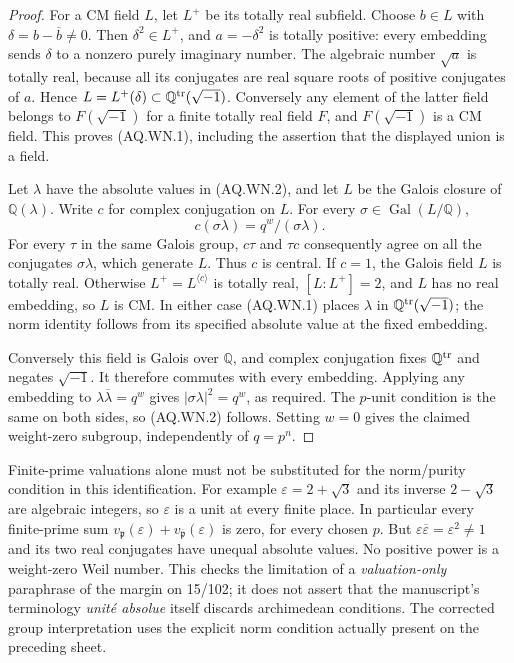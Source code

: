 \documentclass[11pt,a4paper]{article}
\theoremstyle{definition}\newtheorem{definition}[theorem]{Definition}
\theoremstyle{remark}\newtheorem{remark}[theorem]{Remark}
\begin{document}
\begin{proof}
For a CM field $L$, let $L^+$ be its totally real
subfield.  Choose $b\in L$ with
$\delta=b-\overline b\ne0$.  Then
$\delta^2\in L^+$, and $a=-\delta^2$ is totally positive:
every embedding sends $\delta$ to a nonzero purely
imaginary number.  The algebraic number $\sqrt a$
is totally real, because all its conjugates are real
square roots of positive conjugates of $a$.
Hence
$L=L^+(\delta)\subset\mathbb Q^{\rm tr}(\sqrt{-1})$.
Conversely any element of the latter field belongs to
$F(\sqrt{-1})$ for a finite totally real field $F$,
and $F(\sqrt{-1})$ is a CM field.  This proves (AQ.WN.1),
including the assertion that the displayed union is a field.

Let $\lambda$ have the absolute values in (AQ.WN.2),
and let $L$ be the Galois closure of $\mathbb Q(\lambda)$.
Write $c$ for complex conjugation on $L$.
For every $\sigma\in\operatorname{Gal}(L/\mathbb Q)$,
\[
 c(\sigma\lambda)=q^w/(\sigma\lambda).
\]
For every $\tau$ in the same Galois group,
$c\tau$ and $\tau c$ consequently agree on all the
conjugates $\sigma\lambda$, which generate $L$.
Thus $c$ is central.
If $c=1$, the Galois field $L$ is totally real.
Otherwise $L^+=L^{\langle c\rangle}$ is totally real,
$[L:L^+]=2$, and $L$ has no real embedding, so $L$ is CM.
In either case (AQ.WN.1) places $\lambda$ in
$\mathbb Q^{\rm tr}(\sqrt{-1})$; the norm identity follows
from its specified absolute value at the fixed embedding.

Conversely this field is Galois over $\mathbb Q$, and
complex conjugation fixes $\mathbb Q^{\rm tr}$ and
negates $\sqrt{-1}$.  It therefore commutes with every
embedding.  Applying any embedding to
$\lambda\overline\lambda=q^w$ gives
$|\sigma\lambda|^2=q^w$, as required.
The $p$-unit condition is the same on both sides,
so (AQ.WN.2) follows.  Setting $w=0$ gives the claimed
weight-zero subgroup, independently of $q=p^n$.
\end{proof}

Finite-prime valuations alone must not be substituted
for the norm/purity condition in this identification.
For example $\varepsilon=2+\sqrt3$ and its inverse
$2-\sqrt3$ are algebraic integers, so $\varepsilon$
is a unit at every finite place.  In particular every
finite-prime sum $v_{\mathfrak p}(\varepsilon)+
v_{\overline{\mathfrak p}}(\varepsilon)$ is zero,
for every chosen $p$.  But
$\varepsilon\overline\varepsilon=\varepsilon^2\ne1$
and its two real conjugates have unequal absolute values.
No positive power is a weight-zero Weil number.
This checks the limitation of a \emph{valuation-only}
paraphrase of the margin on 15/102; it does not assert
that the manuscript's terminology \emph{unit\'e absolue}
itself discards archimedean conditions.
The corrected group interpretation uses the explicit
norm condition actually present on the preceding sheet.
\end{document}
